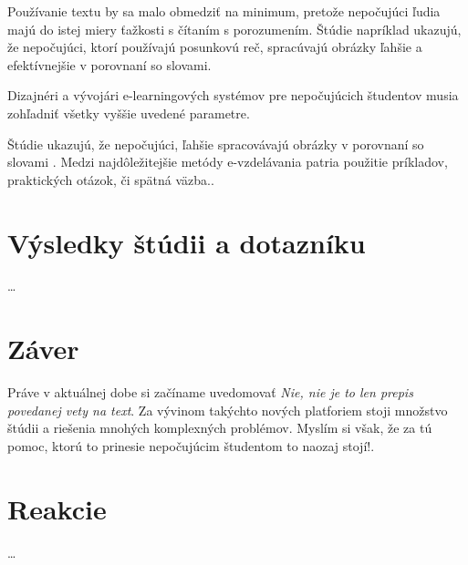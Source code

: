\documentclass[10pt,oneside,slovak,a4paper]{article}
\begin{document}
Používanie textu by sa malo obmedziť na minimum, pretože nepočujúci ľudia majú do istej miery ťažkosti s čítaním s porozumením. Štúdie napríklad ukazujú, že nepočujúci, ktorí používajú posunkovú reč, spracúvajú obrázky ľahšie a efektívnejšie v porovnaní so slovami. 

Dizajnéri a vývojári e-learningových systémov pre nepočujúcich študentov musia zohľadniť všetky vyššie uvedené parametre. \par Štúdie ukazujú, že nepočujúci, ľahšie spracovávajú obrázky v porovnaní so slovami . Medzi  najdôležitejšie metódy e-vzdelávania patria použitie príkladov, praktických otázok, či spätná väzba.. \cite{pappas2018learning}

\section{Výsledky štúdii a dotazníku} \label{dolezitejsia}
\ldots
\section{Záver} \label{zaver} %
Práve v aktuálnej dobe si začíname uvedomovať 
\emph{Nie, nie je to len prepis povedanej vety na text}. Za vývinom takýchto nových platforiem stoji množstvo štúdii a riešenia mnohých komplexných problémov. Myslím si však, že za tú pomoc, ktorú to prinesie nepočujúcim študentom to naozaj stojí!.
\section{Reakcie}
\ldots


\end{document}
